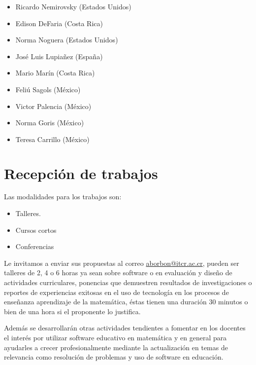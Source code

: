 \documentclass[10pt, notumble, letterpaper]{leaflet}
\begin{document}
\begin{itemize}
    \item Ricardo Nemirovsky (Estados Unidos)

    \item Edison DeFaria (Costa Rica)

    \item Norma Noguera (Estados Unidos)

    \item José Luis Lupiañez (España)

    \item Mario Marín (Costa Rica)

    \item Feliú Sagols (México)

    \item Victor Palencia (México)

    \item Norma Goris (México)

    \item Teresa Carrillo (México)
\end{itemize}

\newpage

\section{Recepción de trabajos}

Las modalidades para los trabajos son:

\begin{itemize}
    \item Talleres.

    \item Cursos cortos

    \item Conferencias
\end{itemize}

Le invitamos a enviar sus propuestas al correo \url{aborbon@itcr.ac.cr}, pueden ser talleres de 2, 4 o 6 horas ya sean sobre software o en evaluación  y diseño de actividades curriculares, ponencias que demuestren resultados de investigaciones o reportes de experiencias exitosas en el uso de tecnología en los procesos de enseñanza aprendizaje de la  matemática, éstas  tienen una duración  30 minutos o bien de una hora si el proponente lo justifica.

Además se desarrollarán otras actividades tendientes a fomentar en los docentes el interés por utilizar software educativo en matemática y en general para ayudarles a crecer profesionalmente mediante la actualización en temas de relevancia como resolución de problemas y uso de software en educación.
\end{document}
